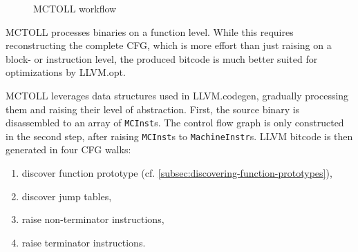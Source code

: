 \begin{figure}[htpb]
    \centering
    \caption{MCTOLL workflow}
    \label{fig:mctoll-workflow}
\end{figure}

MCTOLL processes binaries on a function level.
While this requires reconstructing the complete \gls{CFG}, which is more effort than just raising on a block- or instruction level, the produced bitcode is much better suited for optimizations by LLVM.opt.

MCTOLL leverages data structures used in LLVM.codegen, gradually processing them and raising their level of abstraction.
First, the source binary is disassembled to an array of \texttt{MCInst}s.
The control flow graph is only constructed in the second step, after raising \texttt{MCInst}s to \texttt{MachineInstr}s.
LLVM bitcode is then generated in four \gls{CFG} walks:
\begin{enumerate}
    \item discover function prototype (cf. \cref{subsec:discovering-function-prototypes}),
    \item discover jump tables,
    \item raise non-terminator instructions,
    \item raise terminator instructions.
\end{enumerate}


